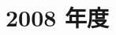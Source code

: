 \documentclass[../../hsm_tok_a.tex]{subfiles}
\begin{document}
    \section{2008 年度}

    

    \clearpage

    
\end{document}
